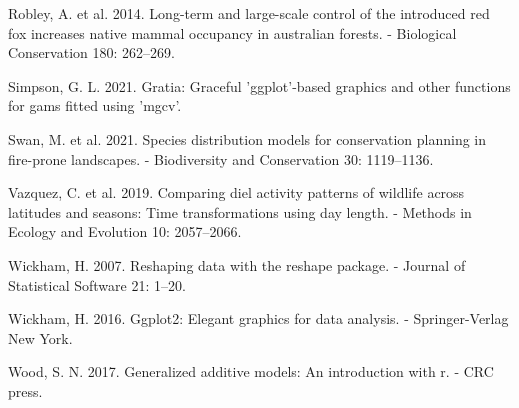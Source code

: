 \documentclass[]{elsarticle} %
\begin{document}
\leavevmode\hypertarget{ref-ROBLEY2014262}{}%
Robley, A. et al. 2014. Long-term and large-scale control of the introduced red fox increases native mammal occupancy in australian forests. - Biological Conservation 180: 262--269.

\leavevmode\hypertarget{ref-gratia}{}%
Simpson, G. L. 2021. Gratia: Graceful 'ggplot'-based graphics and other functions for gams fitted using 'mgcv'.

\leavevmode\hypertarget{ref-swan2021species}{}%
Swan, M. et al. 2021. Species distribution models for conservation planning in fire-prone landscapes. - Biodiversity and Conservation 30: 1119--1136.

\leavevmode\hypertarget{ref-https:ux2fux2fdoi.orgux2f10.1111ux2f2041-210X.13290}{}%
Vazquez, C. et al. 2019. Comparing diel activity patterns of wildlife across latitudes and seasons: Time transformations using day length. - Methods in Ecology and Evolution 10: 2057--2066.

\leavevmode\hypertarget{ref-reshape}{}%
Wickham, H. 2007. Reshaping data with the reshape package. - Journal of Statistical Software 21: 1--20.

\leavevmode\hypertarget{ref-ggplot2}{}%
Wickham, H. 2016. Ggplot2: Elegant graphics for data analysis. - Springer-Verlag New York.

\leavevmode\hypertarget{ref-wood2017}{}%
Wood, S. N. 2017. Generalized additive models: An introduction with r. - CRC press.
\end{document}

